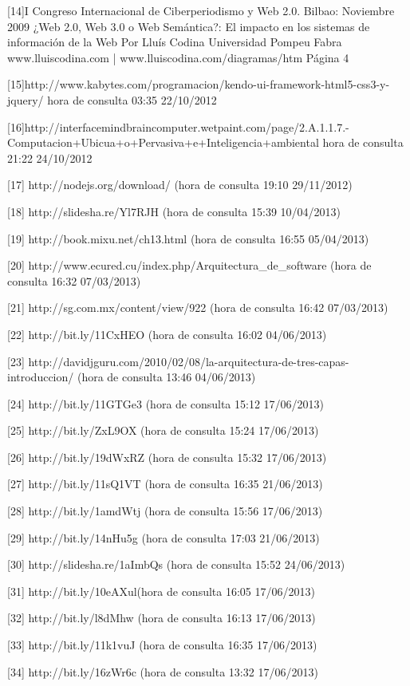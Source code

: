 [14]I Congreso Internacional de Ciberperiodismo y Web 2.0. Bilbao: Noviembre 2009
    ¿Web 2.0, Web 3.0 o Web Semántica?: El impacto en los sistemas de
    información de la Web
    Por Lluís Codina
    Universidad Pompeu Fabra
    www.lluiscodina.com | www.lluiscodina.com/diagramas/htm
    Página 4
    
[15]http://www.kabytes.com/programacion/kendo-ui-framework-html5-css3-y-jquery/ hora de consulta 03:35 22/10/2012

[16]http://interfacemindbraincomputer.wetpaint.com/page/2.A.1.1.7.-Computacion+Ubicua+o+Pervasiva+e+Inteligencia+ambiental hora de consulta 
21:22 24/10/2012

[17] http://nodejs.org/download/ (hora de consulta 19:10 29/11/2012) 

[18] http://slidesha.re/Yl7RJH (hora de consulta 15:39 10/04/2013) 

[19] http://book.mixu.net/ch13.html (hora de consulta 16:55 05/04/2013)

[20] http://www.ecured.cu/index.php/Arquitectura\_de\_software (hora de consulta 16:32 07/03/2013)

[21] http://sg.com.mx/content/view/922 (hora de consulta 16:42 07/03/2013)

[22] http://bit.ly/11CxHEO (hora de consulta 16:02 04/06/2013)

[23] http://davidjguru.com/2010/02/08/la-arquitectura-de-tres-capas-introduccion/ (hora de consulta 13:46 04/06/2013)

[24] http://bit.ly/11GTGe3 (hora de consulta 15:12 17/06/2013)

[25] http://bit.ly/ZxL9OX (hora de consulta 15:24 17/06/2013)

[26] http://bit.ly/19dWxRZ (hora de consulta 15:32 17/06/2013)

[27] http://bit.ly/11sQ1VT (hora de consulta 16:35 21/06/2013)

[28] http://bit.ly/1amdWtj (hora de consulta 15:56 17/06/2013)

[29] http://bit.ly/14nHu5g (hora de consulta 17:03 21/06/2013)

[30] http://slidesha.re/1aImbQs (hora de consulta 15:52 24/06/2013)

[31] http://bit.ly/10eAXul(hora de consulta 16:05 17/06/2013)

[32] http://bit.ly/l8dMhw (hora de consulta 16:13 17/06/2013)

[33] http://bit.ly/11k1vuJ (hora de consulta 16:35 17/06/2013)

[34] http://bit.ly/16zWr6c (hora de consulta 13:32 17/06/2013)

